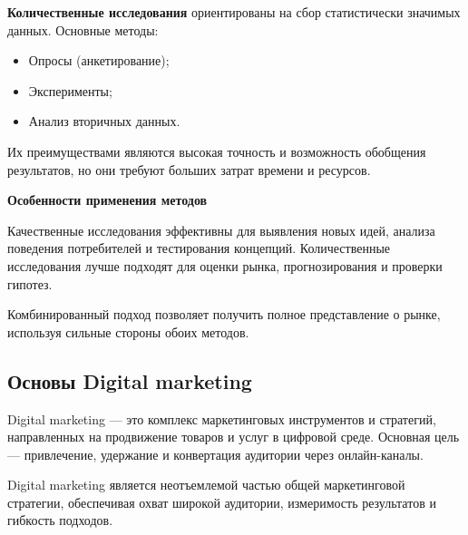 \textbf{Количественные исследования} ориентированы на сбор статистически значимых данных. Основные методы:
\begin{itemize}
    \item Опросы (анкетирование);
    \item Эксперименты;
    \item Анализ вторичных данных.
\end{itemize}
Их преимуществами являются высокая точность и возможность обобщения результатов, но они требуют больших затрат времени и ресурсов.

\textbf{Особенности применения методов}

Качественные исследования эффективны для выявления новых идей, анализа поведения потребителей и тестирования концепций. Количественные исследования лучше подходят для оценки рынка, прогнозирования и проверки гипотез.

Комбинированный подход позволяет получить полное представление о рынке, используя сильные стороны обоих методов.


\pagebreak

\subsection{Основы Digital marketing}

Digital marketing --- это комплекс маркетинговых инструментов и стратегий, направленных на продвижение товаров и услуг в цифровой среде. Основная цель — привлечение, удержание и конвертация аудитории через онлайн-каналы. 

Digital marketing является неотъемлемой частью общей маркетинговой стратегии, обеспечивая охват широкой аудитории, измеримость результатов и гибкость подходов.


